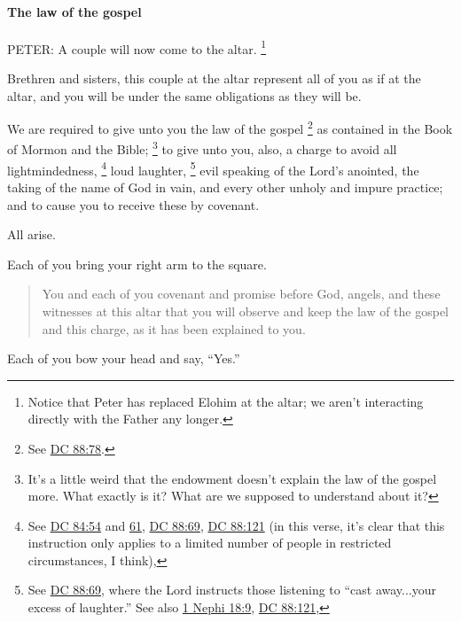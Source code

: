 			\paragraph{The law of the gospel}
				\label{TEMPLE-ENDOWMENT-ENDOW-PRE-1990-GOSPEL}
				
				PETER: A couple will now come to the altar.%
					\footnote{%
						\label{ENDOWMENT-peter-altar}%
						Notice that Peter has replaced Elohim at the altar; we aren't interacting directly with the Father any longer.
						}

				Brethren and sisters, this couple at the altar represent all of you as if at the altar, and you will be under the same obligations as they will be.

				We are required to give unto you the law of the gospel%
					\footnote{%
						See \hyperref[DC88-78]{DC 88:78}.
						}
				as contained in the Book of Mormon and the Bible;%
					\footnote{%
						\label{ENDOWMENT-law-gospel}%
						It's a little weird that the endowment doesn't explain the law of the gospel more. What exactly is it? What are we supposed to understand about it?
						}
				to give unto you, also, a charge to avoid all lightmindedness,%
					\footnote{%
						See \hyperref[DC84-54]{DC 84:54} and \hyperref[DC84-61]{61}, \hyperref[DC88-69]{DC 88:69}, \hyperref[DC88-121]{DC 88:121} (in this verse, it's clear that this instruction only applies to a limited number of people in restricted circumstances, I think),
						}
				loud laughter,%
					\footnote{%
						See \hyperref[DC88-69]{DC 88:69}, where the Lord instructs those listening to ``cast away...your excess of laughter.'' See also \hyperref[1NEPHI-18-9]{1 Nephi 18:9}, \hyperref[DC88-121]{DC 88:121},
						}
				evil speaking of the Lord's anointed, the taking of the name of God in vain, and every other unholy and impure practice; and to cause you to receive these by covenant.

				All arise.

				Each of you bring your right arm to the square.

				\begin{quote}
					You and each of you covenant and promise before God, angels, and these witnesses at this altar that you will observe and keep the law of the gospel and this charge, as it has been explained to you.
				\end{quote}
				
				Each of you bow your head and say, ``Yes.''


